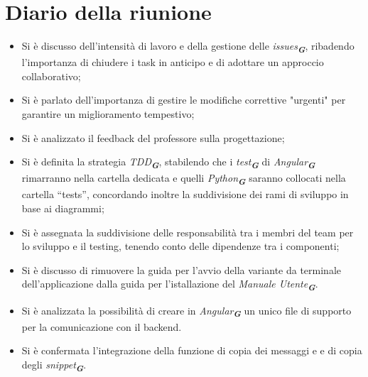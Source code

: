
\section{Diario della riunione}

\begin{itemize}
    \item Si è discusso dell’intensità di lavoro e della gestione delle \emph{issues}\textsubscript{\textit{\textbf{G}}}, ribadendo l’importanza di chiudere i task in anticipo e di adottare un approccio collaborativo;  
    \item Si è parlato dell’importanza di gestire le modifiche correttive "urgenti" per garantire un miglioramento tempestivo;  
    \item Si è analizzato il feedback del professore sulla progettazione;  
    \item Si è definita la strategia \emph{TDD}\textsubscript{\textit{\textbf{G}}}, stabilendo che i \emph{test}\textsubscript{\textit{\textbf{G}}} di \emph{Angular}\textsubscript{\textit{\textbf{G}}} rimarranno nella cartella dedicata e quelli \emph{Python}\textsubscript{\textit{\textbf{G}}} saranno collocati nella cartella “tests”, concordando inoltre la suddivisione dei rami di sviluppo in base ai diagrammi;  
    \item Si è assegnata la suddivisione delle responsabilità tra i membri del team per lo sviluppo e il testing, tenendo conto delle dipendenze tra i componenti;  
    \item Si è discusso di rimuovere la guida per l'avvio della variante da terminale dell'applicazione dalla guida per l'istallazione del \emph{Manuale Utente}\textsubscript{\textit{\textbf{G}}}.
    \item Si è analizzata la possibilità di creare in \emph{Angular}\textsubscript{\textit{\textbf{G}}} un unico file di supporto per la comunicazione con il backend. 
    \item Si è confermata l’integrazione della funzione di copia dei messaggi e e di copia degli \emph{snippet}\textsubscript{\textit{\textbf{G}}}.
\end{itemize}


